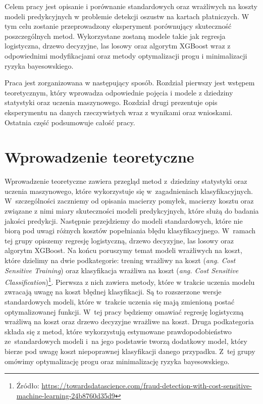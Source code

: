 \documentclass[inzynierska]{pwr_wmat_praca_dyplomowa}
\theoremstyle{plain}
\numberwithin{theorem}{chapter}
\theoremstyle{definition}
\numberwithin{theorem}{chapter}
\begin{document}
Celem pracy jest opisanie i porównanie standardowych oraz wrażliwych na koszty modeli predykcyjnych w problemie detekcji oszustw na kartach płatniczych. W tym celu zostanie przeprowadzony eksperyment porównujący skuteczność poszczególnych metod. Wykorzystane zostaną modele takie jak regresja logistyczna, drzewo decyzyjne, las losowy oraz algorytm XGBoost wraz z odpowiednimi modyfikacjami oraz metody optymalizacji progu i minimalizacji ryzyka bayesowskiego.

Praca jest zorganizowana w następujący sposób. Rozdział pierwszy jest wstępem teoretycznym, który wprowadza odpowiednie pojęcia i modele z dziedziny statystyki oraz uczenia maszynowego. Rozdział drugi prezentuje opis eksperymentu na danych rzeczywistych wraz z wynikami oraz wnioskami. Ostatnia część podsumowuje całość pracy.

\chapter{Wprowadzenie teoretyczne}

Wprowadzenie teoretyczne zawiera przegląd metod z~dziedziny statystyki oraz uczenia maszynowego, które wykorzystuje się w~zagadnieniach klasyfikacyjnych. W~szczególności zaczniemy od opisania macierzy pomyłek, macierzy kosztu oraz związane z nimi miary skuteczności modeli predykcyjnych, które służą do badania jakości predykcji. Następnie przejdziemy do modeli standardowych, które nie biorą pod uwagi różnych kosztów popełniania błędu klasyfikacyjnego. W~ramach tej grupy opiszemy regresję logistyczną, drzewo decyzyjne, las losowy oraz algorytm XGBoost. Na końcu poruszymy temat modeli wrażliwych na koszt, które dzielimy na dwie podkategorie: trening wrażliwy na koszt (\textit{ang. Cost Sensitive Training}) oraz klasyfikacja wrażliwa na koszt (\textit{ang. Cost Sensitive Classification})\footnote{Źródło:  \url{https://towardsdatascience.com/fraud-detection-with-cost-sensitive-machine-learning-24b8760d35d9}}. Pierwsza z nich zawiera metody, które w trakcie uczenia modelu zwracają uwagę na koszt błędnej klasyfikacji. Są to rozszerzone wersje standardowych modeli, które w~trakcie uczenia się mają zmienioną postać optymalizowanej funkcji. W~tej pracy będziemy omawiać regresję logistyczną wrażliwą na koszt oraz drzewo decyzyjne wrażliwe na koszt. Druga podkategoria składa się z metod, które wykorzystują estymowane prawdopodobieństwo ze~standardowych modeli i~na jego podstawie tworzą dodatkowy model, który bierze pod uwagę koszt niepoprawnej klasyfikacji danego przypadku. Z~tej grupy omówimy optymalizację progu oraz minimalizację ryzyka bayesowskiego.
\end{document}
